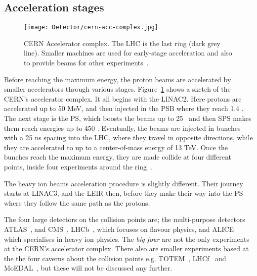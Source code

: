 		\subsection*{Acceleration stages}

			\begin{figure}[!htb]
				\texttt{[image: Detector/cern-acc-complex.jpg]}
				\caption{\ac{CERN} Accelerator complex. The \ac{LHC} is the last ring (dark grey line). Smaller machines are used for early-stage acceleration and also to provide beams for other experiments~\cite{Lefevre2008}.}
				\label{fig:cern-acc-complex}
			\end{figure}

			Before reaching the maximum energy, the proton beams are accelerated by smaller accelerators through various stages. Figure~\ref{fig:cern-acc-complex} shows a sketch of the \ac{CERN}'s accelerator complex. It all begins with the \ac{LINAC2}. Here protons are accelerated up to 50 MeV, and then injected in the \ac{PSB} where they reach 1.4 \GeV. The next stage is the \ac{PS}, which boosts the beams up to 25 \GeV\, and then \ac{SPS} makes them reach energies up to 450 \GeV. Eventually, the beams are injected in bunches with a 25 ns spacing into the \ac{LHC}, where they travel in opposite directions, while they are accelerated to up to a center-of-mass energy of 13 TeV. Once the bunches reach the maximum energy, they are made collide at four different points, inside four experiments around the ring~\cite{LHCDesignReport}. 

			The heavy ion beams acceleration procedure is slightly different. Their journey starts at \ac{LINAC3}, and the \ac{LEIR} then, before they make their way into the \ac{PS} where they follow the same path as the protons. 

			The four large detectors on the collision points are; the multi-purpose detectors \ac{ATLAS}~\cite{ATLASJINST}, and \ac{CMS}~\cite{CMSJINST}, \ac{LHCb}~\cite{LHCb2008}, which focuses on flavour physics, and \ac{ALICE}~\cite{ALICEJINST} which specialises in heavy ion physics. The \emph{big four} are not the only experiments at the \ac{CERN}'s accelerator complex. There also are smaller experiments based at the the four caverns about the collision points e.g. \ac{TOTEM}~\cite{1748-0221-3-08-S08007}, \ac{LHCf}~\cite{Adriani:926196} and \ac{MoEDAL}~\cite{Pinfold:2017dot}, but these will not be discussed any further.
		



